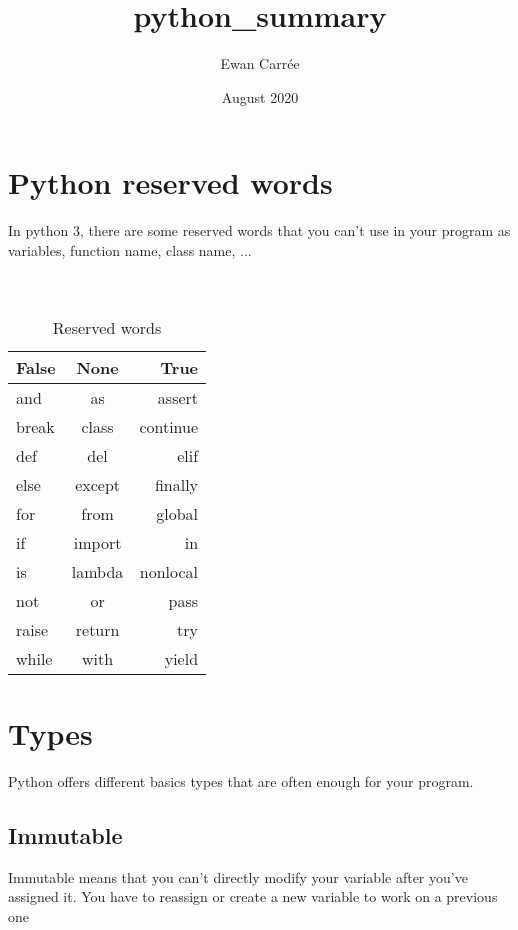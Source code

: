 \documentclass[a4paper, 12pt]{article}
\title{\textbf{python\_summary}}
\author{Ewan Carrée}
\date{August 2020}
\begin{document}
\maketitle
\newpage

\tableofcontents

\newpage
\section{Python reserved words}
In python 3, there are some reserved words that you can't use in your program as variables, function name, class name, ... \\ \\ \\

\begin{table}[h]
\begin{center}
{\renewcommand{\arraystretch}{2} %
{\setlength{\tabcolsep}{1.5cm} %
\begin{tabular}{|l|c|r|}
  \hline
  False & None & True \\
  \hline
  and & as & assert \\
  \hline
  break & class & continue \\
  \hline
  def & del & elif \\
  \hline
  else & except & finally \\
  \hline
  for & from & global \\
  \hline
  if & import & in \\
  \hline
  is & lambda & nonlocal \\
  \hline 
  not & or & pass \\
  \hline 
  raise & return & try \\
  \hline
  while & with & yield \\
  \hline
\end{tabular}}}
\end{center}
\caption{Reserved words}
\end{table}



\clearpage
\section{Types}
Python offers different basics types that are often enough for your program.\newline

\subsection{Immutable}
Immutable means that you can't directly modify your variable after you've assigned it. You have to reassign or create a new variable to work on a previous one\newline
\end{document}
